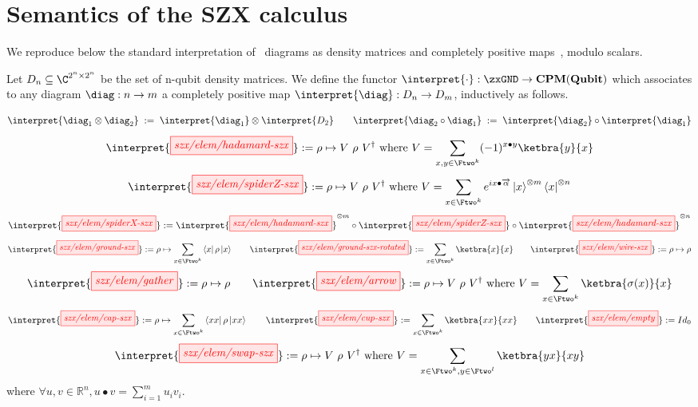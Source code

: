 \section{Semantics of the SZX calculus}%
\label{sec:szx-extended}

We reproduce below the standard interpretation of \szxGND\ diagrams as
density matrices and completely positive
maps~\cite{CJPV19completenessMix,carette_quantum_2021}, modulo scalars.

Let $D_n \subseteq \C^{2^n \times 2^n}$ be the set of n-qubit density
matrices. We define the functor $\interpret{\cdot} : \zxGND \to
\mathbf{CPM(Qubit)}$ which associates to any diagram $\diag : n \to m$ a completely
positive map $\interpret{\diag} : D_n \to D_m$, inductively as
follows.

\[
  \interpret{\diag_1 \otimes \diag_2}
  \;:=\;
  \interpret{\diag_1} \otimes \interpret{D_2}
  \qquad
  \interpret{\diag_2 \circ \diag_1}
  \;:=\;
  \interpret{\diag_2} \circ \interpret{\diag_1}
\]
\[
    \interpret{\tikzfig{szx/elem/hadamard-szx}} :=
      \rho \mapsto V~\rho~V^\dagger
      \text{ where\ }
      V = \sum_{x,y \in \Ftwo^k}
      (-1)^{x \bullet y} \ketbra{y}{x}
\]
\[
    \interpret{\tikzfig{szx/elem/spiderZ-szx}} :=  
      \rho \mapsto V~\rho~V^\dagger
      \text{ where\ }
      V = \sum_{x \in \Ftwo^k}
      e^{i x\bullet\overrightarrow\alpha} \ket{x}^{\otimes m}\bra{x}^{\otimes n}
\]
\[
    \interpret{\tikzfig{szx/elem/spiderX-szx}} :=
    \interpret{\tikzfig{szx/elem/hadamard-szx}}^{\otimes m} \circ
    \interpret{\tikzfig{szx/elem/spiderZ-szx}} \circ
    \interpret{\tikzfig{szx/elem/hadamard-szx}}^{\otimes n}
\]
\[
    \interpret{\tikzfig{szx/elem/ground-szx}} :=
      \rho \mapsto
      \sum_{x \in \Ftwo^k}
      \bra{x} \rho \ket{x}
    \qquad
    \interpret{\tikzfig{szx/elem/ground-szx-rotated}} :=
      \sum_{x \in \Ftwo^k}
      \ketbra{x}{x}
    \qquad
    \interpret{\tikzfig{szx/elem/wire-szx}} :=
    \rho \mapsto \rho
\]
\[
    \interpret{\tikzfig{szx/elem/gather}} :=
      \rho \mapsto \rho
    \qquad
    \interpret{\tikzfig{szx/elem/arrow}} :=  
      \rho \mapsto V~\rho~V^\dagger
      \text{ where\ }
      V = \sum_{x \in \Ftwo^k}
      \ketbra{\sigma(x)}{x}
\]
\[
    \interpret{\tikzfig{szx/elem/cap-szx}} :=
      \rho \mapsto
      \sum_{x \in \Ftwo^k}
      \bra{xx} \rho \ket{xx}
    \qquad
    \interpret{\tikzfig{szx/elem/cup-szx}} :=
      \sum_{x \in \Ftwo^k}
      \ketbra{xx}{xx}
    \qquad
    \interpret{\tikzfig{szx/elem/empty}} := Id_0
\]
\[
    \interpret{\tikzfig{szx/elem/swap-szx}} :=
      \rho \mapsto V~\rho~V^\dagger
      \text{ where\ }
      V = \sum_{x \in \Ftwo^k, y \in \Ftwo^l}
      \ketbra{yx}{xy}
\]
where $\forall u,v\in \mathbb{R}^n, u \bullet v = \sum_{i=1}^m u_i v_i$.

